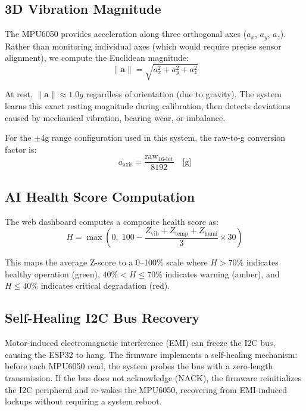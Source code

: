 \documentclass[conference]{IEEEtran}
\begin{document}
\subsection{3D Vibration Magnitude}

The MPU6050 provides acceleration along three orthogonal axes ($a_x$, $a_y$, $a_z$). Rather than monitoring individual axes (which would require precise sensor alignment), we compute the Euclidean magnitude:
\begin{equation}
\|\mathbf{a}\| = \sqrt{a_x^2 + a_y^2 + a_z^2}
\end{equation}

At rest, $\|\mathbf{a}\| \approx 1.0g$ regardless of orientation (due to gravity). The system learns this exact resting magnitude during calibration, then detects deviations caused by mechanical vibration, bearing wear, or imbalance.

For the $\pm$4g range configuration used in this system, the raw-to-g conversion factor is:
\begin{equation}
a_{\text{axis}} = \frac{\text{raw}_{16\text{-bit}}}{8192} \quad \text{[g]}
\end{equation}

\subsection{AI Health Score Computation}

The web dashboard computes a composite health score as:
\begin{equation}
H = \max\left(0, \; 100 - \frac{Z_{\text{vib}} + Z_{\text{temp}} + Z_{\text{humi}}}{3} \times 30\right)
\end{equation}

This maps the average Z-score to a 0--100\% scale where $H > 70\%$ indicates healthy operation (green), $40\% < H \leq 70\%$ indicates warning (amber), and $H \leq 40\%$ indicates critical degradation (red).

\subsection{Self-Healing I2C Bus Recovery}

Motor-induced electromagnetic interference (EMI) can freeze the I2C bus, causing the ESP32 to hang. The firmware implements a self-healing mechanism: before each MPU6050 read, the system probes the bus with a zero-length transmission. If the bus does not acknowledge (NACK), the firmware reinitializes the I2C peripheral and re-wakes the MPU6050, recovering from EMI-induced lockups without requiring a system reboot.
\end{document}
